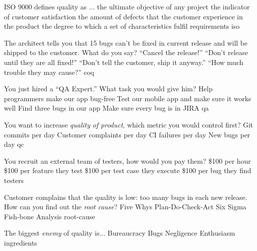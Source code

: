 \documentclass{article}
\begin{document}


\pmbaQuestion
  {ISO 9000 defines quality as ...}
  {the ultimate objective of any project}
  {the indicator of customer satisfaction}
  {the amount of defects that the customer experience in the product}
  {the degree to which a set of characteristics fulfil requirements}
  {iso}

\pmbaQuestion
  {The architect tells you that 15 bugs can't be fixed in current release and will be shipped to the customer. What do you say?}
  {``Cancel the release!''}
  {``Don't release until they are all fixed!''}
  {``Don't tell the customer, ship it anyway.''}
  {``How much trouble they may cause?''}
  {coq}

\pmbaQuestion
  {You just hired a ``QA Expert.'' What task you would give him?}
  {Help programmers make our app bug-free}
  {Test our mobile app and make sure it works well}
  {Find three bugs in our app}
  {Make sure every bug is in JIRA}
  {qa}

\pmbaQuestion
  {You want to increase \emph{quality of product}, which metric you would control first?}
  {Git commits per day}
  {Customer complaints per day}
  {CI failures per day}
  {New bugs per day}
  {qc}

\pmbaQuestion
  {You recruit an external team of testers, how would you pay them?}
  {\$100 per hour}
  {\$100 per feature they test}
  {\$100 per test case they execute}
  {\$100 per bug they find}
  {testers}

\pmbaQuestion
  {Customer complains that the quality is low: too many bugs in each new release. How can you find out the \emph{root cause}?}
  {Five Whys}
  {Plan-Do-Check-Act}
  {Six Sigma}
  {Fish-bone Analysis}
  {root-cause}

\pmbaQuestion
  {The biggest \emph{enemy} of quality is...}
  {Bureaucracy}
  {Bugs}
  {Negligence}
  {Enthusiasm}
  {ingredients}
\end{document}
